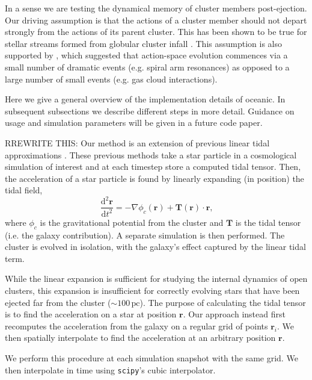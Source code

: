 \documentclass[11pt,letterpaper]{article}
\newcommand{\beq}{\begin{equation}}
\newcommand{\eeq}{\end{equation}}
\newcommand{\pc}{\text{pc}}
\newcommand{\dint}{\text{d}}
\begin{document}
\begin{multicols}{2}
In a sense we are testing the dynamical memory of cluster members post-ejection. Our driving assumption is that the actions of a cluster member should not depart strongly from the actions of its parent cluster. This has been shown to be true for stellar streams formed from globular cluster infall \citep{Eyre11:MechTidalStreams}. This assumption is also supported by \citet{Beane18:Actions}, which suggested that action-space evolution commences via a small number of dramatic events (e.g. spiral arm resonances) as opposed to a large number of small events (e.g. gas cloud interactions).


Here we give a general overview of the implementation details of oceanic. In subsequent subsections we describe different steps in more detail. Guidance on usage and simulation parameters will be given in a future code paper.

RREWRITE THIS: Our method is an extension of previous linear tidal approximations \citep{Renaud11:NBODY6tt,Mamikonyan17:Kira}. These previous methods take a star particle in a cosmological simulation of interest and at each timestep store a computed tidal tensor. Then, the acceleration of a star particle is found by linearly expanding (in position) the tidal field,
\beq\label{eq:tidal_linear}
\frac{\dint^2 \bm{r}}{\dint t^2} = - \nabla \phi_c(\bm{r}) + \bm{T}(\bm{r}) \cdot \bm{r}\text{,}
\eeq
where $\phi_c$ is the gravitational potential from the cluster and $\bm{T}$ is the tidal tensor (i.e. the galaxy contribution). A separate simulation is then performed. The cluster is evolved in isolation, with the galaxy's effect captured by the linear tidal term.

While the linear expansion is sufficient for studying the internal dynamics of open clusters, this expansion is insufficient for correctly evolving stars that have been ejected far from the cluster ($\sim 100\,\pc$). The purpose of calculating the tidal tensor is to find the acceleration on a star at position $\bm{r}$. Our approach instead first recomputes the acceleration from the galaxy on a regular grid of points $\bm{r}_i$. We then spatially interpolate to find the acceleration at an arbitrary position $\bm{r}$.

We perform this procedure at each simulation snapshot with the same grid. We then interpolate in time using \texttt{scipy}'s cubic interpolator.


\end{multicols}

\end{document}
